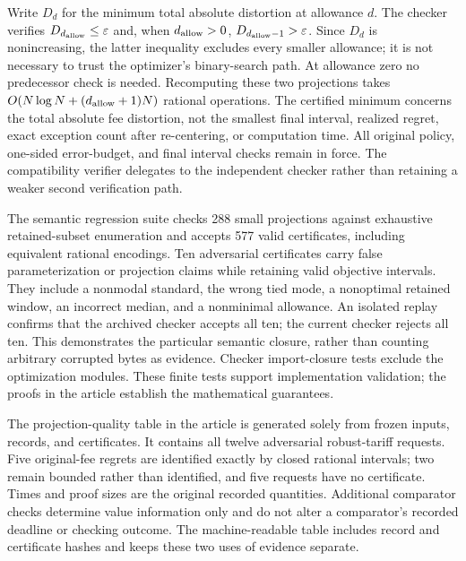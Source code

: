 Write $D_d$ for the minimum total absolute distortion at allowance $d$. The checker verifies $D_{d_{\rm allow}}\leq\varepsilon$ and, when $d_{\rm allow}>0$, $D_{d_{\rm allow}-1}>\varepsilon$. Since $D_d$ is nonincreasing, the latter inequality excludes every smaller allowance; it is not necessary to trust the optimizer's binary-search path. At allowance zero no predecessor check is needed. Recomputing these two projections takes $O(N\log N+(d_{\rm allow}+1)N)$ rational operations. The certified minimum concerns the total absolute fee distortion, not the smallest final interval, realized regret, exact exception count after re-centering, or computation time. All original policy, one-sided error-budget, and final interval checks remain in force. The compatibility verifier delegates to the independent checker rather than retaining a weaker second verification path.

The semantic regression suite checks 288 small projections against exhaustive retained-subset enumeration and accepts 577 valid certificates, including equivalent rational encodings. Ten adversarial certificates carry false parameterization or projection claims while retaining valid objective intervals. They include a nonmodal standard, the wrong tied mode, a nonoptimal retained window, an incorrect median, and a nonminimal allowance. An isolated replay confirms that the archived checker accepts all ten; the current checker rejects all ten. This demonstrates the particular semantic closure, rather than counting arbitrary corrupted bytes as evidence. Checker import-closure tests exclude the optimization modules. These finite tests support implementation validation; the proofs in the article establish the mathematical guarantees.

The projection-quality table in the article is generated solely from frozen inputs, records, and certificates. It contains all twelve adversarial robust-tariff requests. Five original-fee regrets are identified exactly by closed rational intervals; two remain bounded rather than identified, and five requests have no certificate. Times and proof sizes are the original recorded quantities. Additional comparator checks determine value information only and do not alter a comparator's recorded deadline or checking outcome. The machine-readable table includes record and certificate hashes and keeps these two uses of evidence separate.

